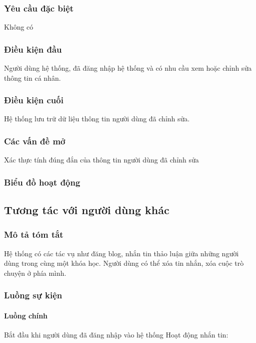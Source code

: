 \documentclass[./../main_file.tex]{subfiles}
\begin{document}
\subsubsection{Yêu cầu đặc biệt}
Không có

\subsubsection{Điều kiện đầu}
Người dùng hệ thống, đã đăng nhập hệ thống và có nhu cầu xem hoặc chỉnh sửa thông tin cá nhân.

\subsubsection{Điều kiện cuối}
Hệ thống lưu trữ dữ liệu thông tin người dùng đã chỉnh sửa.

\subsubsection{Các vấn đề mở}
Xác thực tính đúng đắn của thông tin người dùng đã chỉnh sửa

\subsubsection{Biểu đồ hoạt động}

\subsection{Tương tác với người dùng khác}
\subsubsection{Mô tả tóm tắt}
Hệ thống có các tác vụ như đăng blog, nhắn tin thảo luận giữa những người dùng trong cùng một khóa học. Người dùng có thể xóa tin nhắn, xóa cuộc trò chuyện ở phía mình.
\subsubsection{Luồng sự kiện}
\paragraph{Luồng chính}
	Bắt đầu khi người dùng đã đăng nhập vào hệ thống
	Hoạt động nhắn tin:
\end{document}
